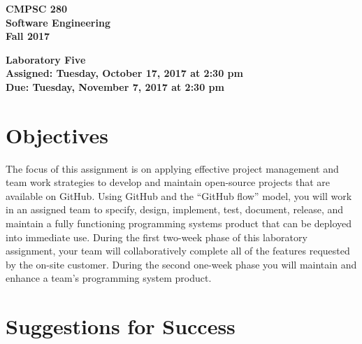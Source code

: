 \documentclass[11pt]{article}
\newcommand{\assignmentduedate}{November 7}
\newcommand{\assignmentassignedate}{October 17}
\newcommand{\assignmentnumber}{Five}
\newcommand{\labyear}{2017}
\newcommand{\labday}{Tuesday}
\newcommand{\labtime}{2:30 pm}
\newcommand{\assigneddate}{Assigned: \labday, \assignmentassignedate, \labyear{} at \labtime{}}
\newcommand{\duedate}{Due: \labday, \assignmentduedate, \labyear{} at \labtime{}}
\newcommand{\labtitle}[1]
{
  \begin{center}
    \begin{center}
      \bf
      CMPSC 280\\Software Engineering\\
      Fall 2017\\
      \medskip
    \end{center}
    \bf
    #1
  \end{center}
}
\begin{document}
\thispagestyle{empty}

\labtitle{Laboratory \assignmentnumber{} \\ \assigneddate{} \\ \duedate{}}

\section*{Objectives}

The focus of this assignment is on applying effective project management and team work strategies to develop and
maintain open-source projects that are available on GitHub. Using GitHub and the ``GitHub flow'' model, you will work in
an assigned team to specify, design, implement, test, document, release, and maintain a fully functioning programming
systems product that can be deployed into immediate use. During the first two-week phase of this laboratory assignment,
your team will collaboratively complete all of the features requested by the on-site customer. During the second
one-week phase you will maintain and enhance a team's programming system product.

\section*{Suggestions for Success}
\end{document}
